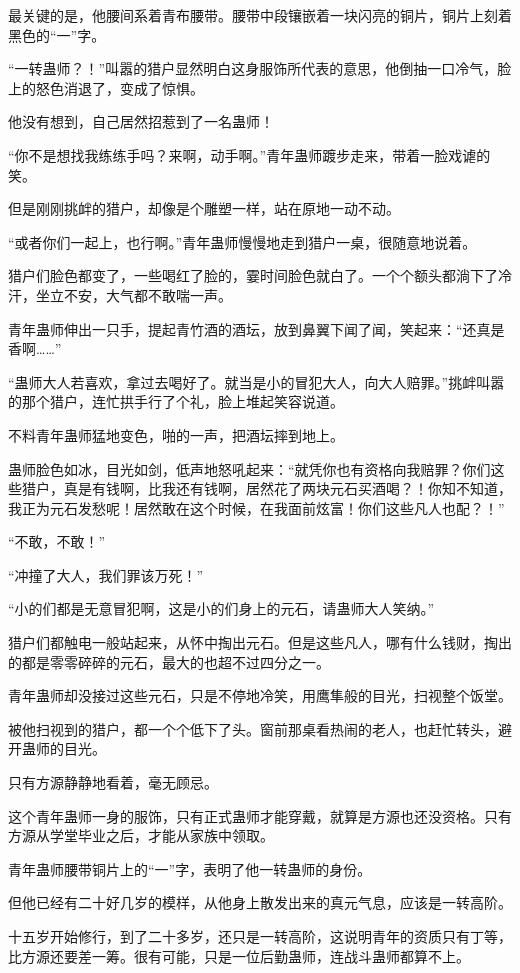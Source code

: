\begin{this_body}
最关键的是，他腰间系着青布腰带。腰带中段镶嵌着一块闪亮的铜片，铜片上刻着黑色的“一”字。

“一转蛊师？！”叫嚣的猎户显然明白这身服饰所代表的意思，他倒抽一口冷气，脸上的怒色消退了，变成了惊惧。

他没有想到，自己居然招惹到了一名蛊师！

“你不是想找我练练手吗？来啊，动手啊。”青年蛊师踱步走来，带着一脸戏谑的笑。

但是刚刚挑衅的猎户，却像是个雕塑一样，站在原地一动不动。

“或者你们一起上，也行啊。”青年蛊师慢慢地走到猎户一桌，很随意地说着。

猎户们脸色都变了，一些喝红了脸的，霎时间脸色就白了。一个个额头都淌下了冷汗，坐立不安，大气都不敢喘一声。

青年蛊师伸出一只手，提起青竹酒的酒坛，放到鼻翼下闻了闻，笑起来：“还真是香啊……”

“蛊师大人若喜欢，拿过去喝好了。就当是小的冒犯大人，向大人赔罪。”挑衅叫嚣的那个猎户，连忙拱手行了个礼，脸上堆起笑容说道。

不料青年蛊师猛地变色，啪的一声，把酒坛摔到地上。

蛊师脸色如冰，目光如剑，低声地怒吼起来：“就凭你也有资格向我赔罪？你们这些猎户，真是有钱啊，比我还有钱啊，居然花了两块元石买酒喝？！你知不知道，我正为元石发愁呢！居然敢在这个时候，在我面前炫富！你们这些凡人也配？！”

“不敢，不敢！”

“冲撞了大人，我们罪该万死！”

“小的们都是无意冒犯啊，这是小的们身上的元石，请蛊师大人笑纳。”

猎户们都触电一般站起来，从怀中掏出元石。但是这些凡人，哪有什么钱财，掏出的都是零零碎碎的元石，最大的也超不过四分之一。

青年蛊师却没接过这些元石，只是不停地冷笑，用鹰隼般的目光，扫视整个饭堂。

被他扫视到的猎户，都一个个低下了头。窗前那桌看热闹的老人，也赶忙转头，避开蛊师的目光。

只有方源静静地看着，毫无顾忌。

这个青年蛊师一身的服饰，只有正式蛊师才能穿戴，就算是方源也还没资格。只有方源从学堂毕业之后，才能从家族中领取。

青年蛊师腰带铜片上的“一”字，表明了他一转蛊师的身份。

但他已经有二十好几岁的模样，从他身上散发出来的真元气息，应该是一转高阶。

十五岁开始修行，到了二十多岁，还只是一转高阶，这说明青年的资质只有丁等，比方源还要差一筹。很有可能，只是一位后勤蛊师，连战斗蛊师都算不上。


\end{this_body}
